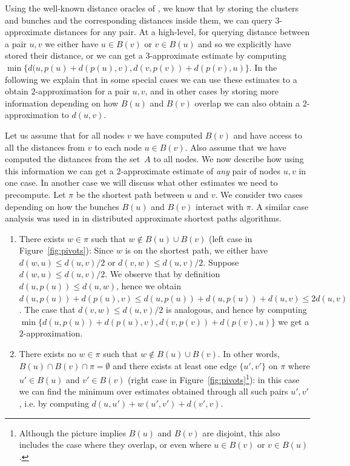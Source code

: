\documentclass[11pt]{article}
\theoremstyle{definition}
\theoremstyle{remark}
\begin{document}
Using the well-known distance oracles of \cite{TZ2005}, we know that by storing the clusters and bunches and the corresponding distances inside them, we can query $3$-approximate distances for any pair. At a high-level, for querying distance between a pair $u, v$ we either have $u \in B(v)$ or $v \in B(u)$ and so we explicitly have stored their distance, or we can get a $3$-approximate estimate by computing $\min \{d(u,p(u)+d(p(u),v), d(v, p(v))+d(p(v), u)\}$. In the following we explain that in some special cases we can use these estimates to a obtain $2$-approximation for a pair $u,v$, and in other cases by storing more information depending on how $B(u)$ and $B(v)$ overlap we can also obtain a $2$-approximation to $d(u,v)$. 

Let us assume that for all nodes $v$ we have computed $B(v)$ and have access to all the distances from $v$ to each node $u \in B(v)$. Also assume that we have computed the distances from the set~$A$ to all nodes.
We now describe how using this information we can get a $2$-approximate estimate of \textit{any} pair of nodes $u,v$ in one case. In another case we will discuss what other estimates we need to precompute. Let $\pi$ be the shortest path between $u$ and $v$.
 We consider two cases depending on how the bunches $B(u)$ and $B(v)$ interact with $\pi$. A similar case analysis was used in \cite{censor2021fast, dory2022exponentially} in distributed approximate shortest paths algorithms. 
\begin{enumerate}
    \setlength\itemsep{0em}
    \item \label{overview:outside_bunch} There exists $w \in \pi$ such that $w \not \in B(u) \cup B(v)$ (left case in Figure~\ref{fig:pivots}): Since $w$ is on the shortest path, we either have $d(w,u) \leq d(u,v)/2$ or $d (v,w) \leq d(u,v)/2$. Suppose $d(w,u) \leq d(u,v)/2$. We observe that by definition $d(u,p(u))\leq d(u,w)$, hence we obtain $d(u,p(u))+d(p(u),v)\leq d(u,p(u))+d(u,p(u))+d(u,v) \leq 2d(u,v)$. The case that $d (v,w) \leq d(u,v)/2$ is analogous, and hence by computing $\min \{ d(u,p(u))+d(p(u),v), d(v,p(v))+d(p(v),u)\}$ we get a $2$-approximation.
 
    \item \label{overview:adj_bunches} There exists no $w \in \pi$ such that $w \not \in B(u) \cup B(v)$. In other words, $B(u) \cap B(v) \cap \pi = \emptyset$ and there exists at least one edge $\{u',v'\}$ on $\pi$ where $u' \in B(u)$ and $v' \in B(v)$ (right case in Figure~\ref{fig:pivots}\footnote{Although the picture implies $B(u)$ and $B(v)$ are disjoint, this also includes the case where they overlap, or even where $u\in B(v)$ or $v\in B(u)$.}): in this case we can find the minimum over estimates obtained through all such pairs $u', v'$, i.e. by computing $d(u,u')+ w(u',v')+d(v',v)$. 
\end{enumerate}
\end{document}
